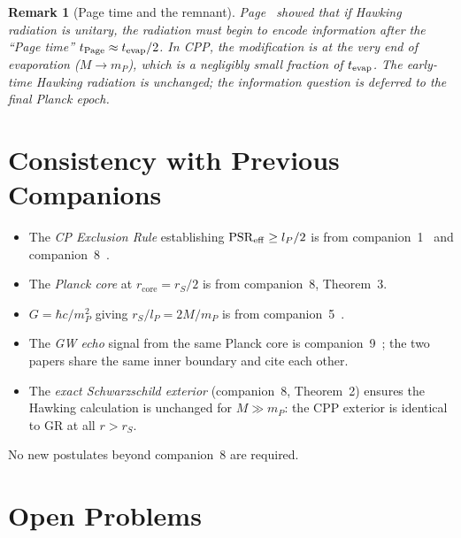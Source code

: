 \documentclass[12pt]{article}
\newtheorem{remark}[theorem]{Remark}
\newcommand{\lP}{l_P}
\newcommand{\mP}{m_P}
\newcommand{\rS}{r_S}
\newcommand{\rcore}{r_{\mathrm{core}}}
\newcommand{\PSR}{\mathrm{PSR}}
\begin{document}
\begin{remark}[Page time and the remnant]
Page~\cite{page1993} showed that if Hawking radiation is unitary, the
radiation must begin to encode information after the ``Page time''
$t_{\rm Page} \approx t_{\rm evap}/2$.  In CPP, the modification
is at the very end of evaporation ($M \to \mP$), which is a negligibly
small fraction of $t_{\rm evap}$.  The early-time Hawking radiation is
unchanged; the information question is deferred to the final Planck
epoch.
\end{remark}

\section{Consistency with Previous Companions}
\label{sec:consistency}

\begin{itemize}[noitemsep]
  \item The \emph{CP Exclusion Rule} establishing $\PSR_{\rm eff} \geq \lP/2$
    is from companion~1~\cite{c1} and companion~8~\cite{c8}.
  \item The \emph{Planck core} at $\rcore = \rS/2$ is from companion~8,
    Theorem~3.
  \item $G = \hbar c/\mP^2$ giving $\rS/\lP = 2M/\mP$ is from
    companion~5~\cite{c5}.
  \item The \emph{GW echo} signal from the same Planck core is
    companion~9~\cite{c9}; the two papers share the same inner
    boundary and cite each other.
  \item The \emph{exact Schwarzschild exterior} (companion~8,
    Theorem~2) ensures the Hawking calculation is unchanged for
    $M \gg \mP$: the CPP exterior is identical to GR at all
    $r > \rS$.
\end{itemize}

No new postulates beyond companion~8 are required.

\section{Open Problems}
\label{sec:open}
\end{document}
